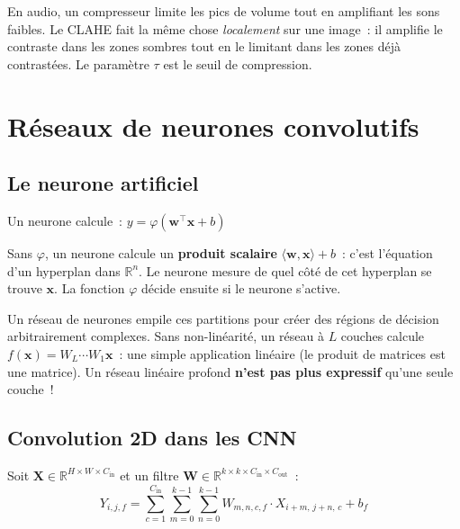 \documentclass[11pt,a4paper]{article}
\newcommand{\R}{\mathbb{R}}
\begin{document}
\begin{intubox}
En audio, un compresseur limite les pics de volume tout en amplifiant les sons faibles. Le CLAHE fait la m\^eme chose \emph{localement} sur une image~: il amplifie le contraste dans les zones sombres tout en le limitant dans les zones d\'ej\`a contrast\'ees. Le param\`etre $\tau$ est le seuil de compression.
\end{intubox}

\section{R\'eseaux de neurones convolutifs}

\subsection{Le neurone artificiel}

Un neurone calcule~: $y = \varphi(\mathbf{w}^\top \mathbf{x} + b)$

\begin{intubox}
Sans $\varphi$, un neurone calcule un \textbf{produit scalaire} $\langle \mathbf{w}, \mathbf{x} \rangle + b$~: c'est l'\'equation d'un hyperplan dans $\R^n$. Le neurone mesure de quel c\^ot\'e de cet hyperplan se trouve $\mathbf{x}$. La fonction $\varphi$ \og{}d\'ecide\fg{} ensuite si le neurone s'active.

Un r\'eseau de neurones empile ces partitions pour cr\'eer des r\'egions de d\'ecision arbitrairement complexes. Sans non-lin\'earit\'e, un r\'eseau \`a $L$ couches calcule $f(\mathbf{x}) = W_L \cdots W_1 \mathbf{x}$~: une simple application lin\'eaire (le produit de matrices est une matrice). Un r\'eseau lin\'eaire profond \textbf{n'est pas plus expressif} qu'une seule couche~!
\end{intubox}

\subsection{Convolution 2D dans les CNN}

\begin{defbox}
Soit $\mathbf{X} \in \R^{H \times W \times C_{\text{in}}}$ et un filtre $\mathbf{W} \in \R^{k \times k \times C_{\text{in}} \times C_{\text{out}}}$~:
\begin{equation}
  Y_{i,j,f} = \sum_{c=1}^{C_{\text{in}}} \sum_{m=0}^{k-1} \sum_{n=0}^{k-1} W_{m,n,c,f} \cdot X_{i+m,\,j+n,\,c} + b_f
\end{equation}
\end{defbox}
\end{document}
